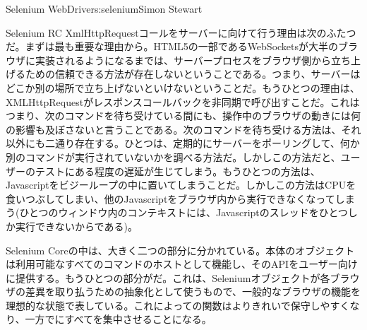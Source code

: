 \begin{aosachapter}{Selenium WebDriver}{s:selenium}{Simon Stewart}
\begin{aosasect1}{Selenium RC}
XmlHttpRequestコールをサーバーに向けて行う理由は次のふたつだ。まずは最も重要な理由から。HTML5の一部であるWebSocketsが大半のブラウザに実装されるようになるまでは、サーバープロセスをブラウザ側から立ち上げるための信頼できる方法が存在しないということである。つまり、サーバーはどこか別の場所で立ち上げないといけないということだ。もうひとつの理由は、XMLHttpRequestがレスポンスコールバックを非同期で呼び出すことだ。これはつまり、次のコマンドを待ち受けている間にも、操作中のブラウザの動きには何の影響も及ぼさないと言うことである。次のコマンドを待ち受ける方法は、それ以外にも二通り存在する。ひとつは、定期的にサーバーをポーリングして、何か別のコマンドが実行されていないかを調べる方法だ。しかしこの方法だと、ユーザーのテストにある程度の遅延が生じてしまう。もうひとつの方法は、Javascriptをビジーループの中に置いてしまうことだ。しかしこの方法はCPUを食いつぶしてしまい、他のJavascriptをブラウザ内から実行できなくなってしまう(ひとつのウィンドウ内のコンテキストには、Javascriptのスレッドをひとつしか実行できないからである)。

Selenium Coreの中は、大きく二つの部分に分かれている。本体のオブジェクトは利用可能なすべてのコマンドのホストとして機能し、そのAPIをユーザー向けに提供する。もうひとつの部分がだ。これは、Seleniumオブジェクトが各ブラウザの差異を取り払うための抽象化として使うもので、一般的なブラウザの機能を理想的な状態で表している。これによっての関数はよりきれいで保守しやすくなり、一方でにすべてを集中させることになる。


\end{aosasect1}
\end{aosachapter}
